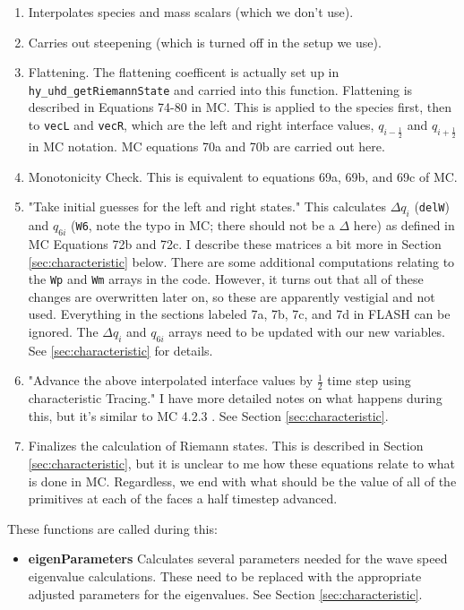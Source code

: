 \documentclass[preprint,11pt]{aastex}
\begin{document}
\begin{description}
\begin{description}
\begin{itemize}
\begin{itemize}
\begin{enumerate}
					\item Interpolates species and mass scalars (which we don't use).
					\item Carries out steepening (which is turned off in the setup we use).
					\item Flattening.  The flattening coefficent is actually set up in \verb!hy_uhd_getRiemannState! and carried into this function.  Flattening is described in Equations 74-80 in MC.  This is applied to the species first, then to \verb!vecL! and \verb!vecR!, which are the left and right interface values, $q_{i-\frac{1}{2}}$ and $q_{i+\frac{1}{2}}$ in MC notation.  MC equations 70a and 70b are carried out here. 
					\item Monotonicity Check.  This is equivalent to equations 69a, 69b, and 69c of MC.
					\item "Take initial guesses for the left and right states."  This calculates $\Delta q_i$ (\verb!delW!) and $q_{6i}$ (\verb!W6!, note the typo in MC; there should not be a $\Delta$ here) as defined in MC Equations 72b and 72c.  I describe these matrices a bit more in Section \ref{sec:characteristic} below.  There are some additional computations relating to the \verb!Wp! and \verb!Wm! arrays in the code.  However, it turns out that all of these changes are overwritten later on, so these are apparently vestigial and not used.  Everything in the sections labeled 7a, 7b, 7c, and 7d in FLASH can be ignored. {\color{red} The $\Delta q_i$ and $q_{6i}$ arrays need to be updated with our new variables.  See \ref{sec:characteristic} for details.}
					\item "Advance the above interpolated interface values by $\frac{1}{2}$ time step using characteristic Tracing."  I have more detailed notes on what happens during this, but it's similar to MC 4.2.3 .  See Section \ref{sec:characteristic}.
					\item Finalizes the calculation of Riemann states.  This is described in Section \ref{sec:characteristic}, but it is unclear to me how these equations relate to what is done in MC.  Regardless, we end with what should be the value of all of the primitives at each of the faces a half timestep advanced.
				\end{enumerate}
				These functions are called during this:
				\begin{itemize}
					\item \textbf{eigenParameters} Calculates several parameters needed for the wave speed eigenvalue calculations. {\color{red} These need to be replaced with the appropriate adjusted parameters for the eigenvalues.  See Section \ref{sec:characteristic}.}

\end{itemize}
\end{itemize}
\end{itemize}
\end{description}
\end{description}
\end{document}

